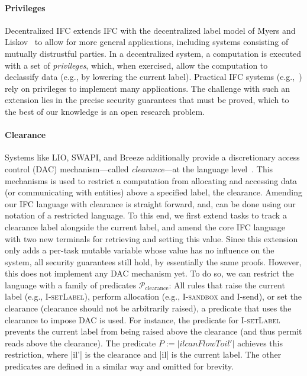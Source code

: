 \paragraph{Privileges}
Decentralized IFC extends IFC with the decentralized label model of
Myers and Liskov~\cite{myers:dlm} to allow for more general
applications, including systems consisting of mutually distrustful
parties.  In a decentralized system, a computation is executed with a
set of \emph{privileges}, which, when exercised, allow the computation
to declassify data (e.g., by lowering the current label).
%
Practical IFC systems
(e.g.,~\cite{Zeldovich:2006, lio,
Hritcu:2013:YIB:2497621.2498098, myers:jif}) rely on privileges to
implement many applications.
%
%
The challenge with such an extension lies in the precise
security guarantees that must be proved, which to the best of our
knowledge is an open research problem.
%

\paragraph{Clearance}
%
Systems like LIO, SWAPI, and Breeze additionally provide a discretionary access
control (DAC) mechanism---called \emph{clearance}---at the language
level~\cite{Hritcu:2013:YIB:2497621.2498098, lio}.
%
This mechanisms is used to restrict a computation from allocating and
accessing data (or communicating with entities) above a specified
label, the clearance.
%
Amending our IFC language with clearance is straight forward,
and, can be done using our notation of a restricted language.
%
To this end, we first extend tasks to track a clearance label
alongside the current label, and amend the core IFC language with two
new terminals for retrieving and setting this value.
%
Since this extension only adds a per-task mutable variable whose value
has no influence on the system, all security guarantees still
hold, by essentially the same proofs.
%
However, this does not implement any DAC mechanism yet.
%
To do so, we can restrict the language with a family of predicates
$\mathcal{P}_\text{clearance}$:
All rules that
raise the current label (e.g., \textsc{I-setLabel}), perform
allocation (e.g., \textsc{I-sandbox} and \textsf{I-send}), or set the
clearance (clearance should not be arbitrarily raised), a predicate
that uses the clearance to impose DAC is used.
%
For instance, the predicate for \textsc{I-setLabel} prevents the
current label from being raised above the clearance (and thus permit
reads above the clearance).  The predicate $P := |il
canFlowTo il'|$ achieves this restriction, where |il'| is the
clearance and |il| is the current
label.
%
The other predicates are defined in a similar way and omitted for
brevity.


